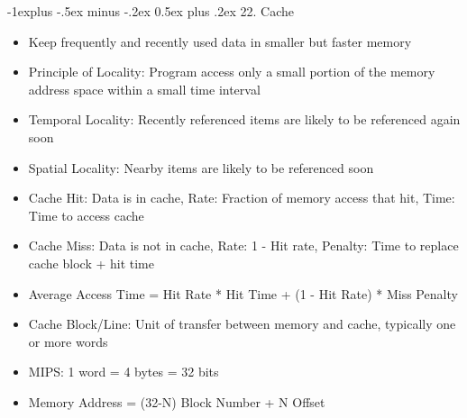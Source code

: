 \documentclass[10pt, portrait]{article}
\makeatletter
\renewcommand{\section}{\@startsection{section}{1}{0mm}%
                                {-1ex plus -.5ex minus -.2ex}%
                                {0.5ex plus .2ex}%
                                {\normalfont\large\bfseries}}
\renewcommand{\section}{\@startsection{section}{2}{0mm}%
                                {-1explus -.5ex minus -.2ex}%
                                {0.5ex plus .2ex}%
                                {\normalfont\normalsize\bfseries}}
\makeatother
\begin{document}
\begin{multicols*}{2}
\section{22. Cache}
\begin{itemize}
    \item Keep frequently and recently used data in smaller but faster memory
    \item Principle of Locality: Program access only a small portion of the memory address space within a small time interval
    \item Temporal Locality: Recently referenced items are likely to be referenced again soon
    \item Spatial Locality: Nearby items are likely to be referenced soon
    \item Cache Hit: Data is in cache, Rate: Fraction of memory access that hit, Time: Time to access cache
    \item Cache Miss: Data is not in cache, Rate: 1 - Hit rate, Penalty: Time to replace cache block + hit time
    \item Average Access Time = Hit Rate * Hit Time + (1 - Hit Rate) * Miss Penalty
    \item Cache Block/Line: Unit of transfer between memory and cache, typically one or more words
    \item MIPS: 1 word = 4 bytes = 32 bits
    \item Memory Address = (32-N) Block Number + N Offset
\end{itemize}


\end{multicols*}
\end{document}
